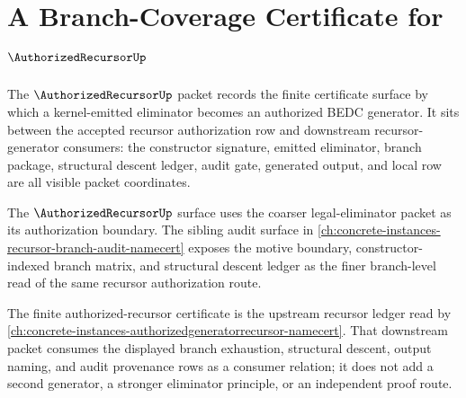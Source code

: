 \chapter{A Branch-Coverage Certificate for $\AuthorizedRecursorUp$}
\label{ch:concrete-instances-authorizedrecursor-certificate-namecert}

The $\AuthorizedRecursorUp$ packet records the finite certificate surface by which a kernel-emitted eliminator becomes an authorized BEDC generator. It sits between the accepted recursor authorization row and downstream recursor-generator consumers: the constructor signature, emitted eliminator, branch package, structural descent ledger, audit gate, generated output, and local \NameCert{} row are all visible packet coordinates.

The $\AuthorizedRecursorUp$ surface uses the coarser legal-eliminator packet as its authorization boundary. The sibling audit surface in \autoref{ch:concrete-instances-recursor-branch-audit-namecert} exposes the motive boundary, constructor-indexed branch matrix, and structural descent ledger as the finer branch-level read of the same recursor authorization route.

The finite authorized-recursor certificate is the upstream recursor ledger read by \autoref{ch:concrete-instances-authorizedgeneratorrecursor-namecert}. That downstream packet consumes the displayed branch exhaustion, structural descent, output naming, and audit provenance rows as a consumer relation; it does not add a second generator, a stronger eliminator principle, or an independent proof route.


